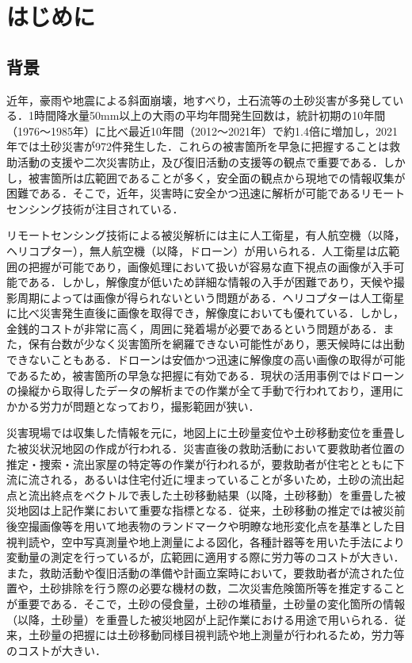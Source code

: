 \chapter{はじめに}
  \section{背景}
    近年，豪雨や地震による斜面崩壊，地すべり，土石流等の土砂災害が多発している．1時間降水量50mm以上の大雨の平均年間発生回数は，統計初期の10年間（1976〜1985年）に比べ最近10年間（2012〜2021年）で約1.4倍に増加し，2021年では土砂災害が972件発生した\cite{背景1, 背景2}．これらの被害箇所を早急に把握することは救助活動の支援や二次災害防止，及び復旧活動の支援等の観点で重要である．しかし，被害箇所は広範囲であることが多く，安全面の観点から現地での情報収集が困難である\cite{背景3}．そこで，近年，災害時に安全かつ迅速に解析が可能であるリモートセンシング技術が注目されている\cite{背景4}．

    リモートセンシング技術による被災解析には主に人工衛星，有人航空機（以降，ヘリコプター），無人航空機（以降，ドローン）が用いられる．人工衛星は広範囲の把握が可能であり，画像処理において扱いが容易な直下視点の画像が入手可能である．しかし，解像度が低いため詳細な情報の入手が困難であり，天候や撮影周期によっては画像が得られないという問題がある．ヘリコプターは人工衛星に比べ災害発生直後に画像を取得でき，解像度においても優れている．しかし，金銭的コストが非常に高く，周囲に発着場が必要であるという問題がある．また，保有台数が少なく災害箇所を網羅できない可能性があり，悪天候時には出動できないこともある．ドローンは安価かつ迅速に解像度の高い画像の取得が可能であるため，被害箇所の早急な把握に有効である．現状の活用事例ではドローンの操縦から取得したデータの解析までの作業が全て手動で行われており，運用にかかる労力が問題となっており，撮影範囲が狭い\cite{背景5, 背景6, 背景7}．

    災害現場では収集した情報を元に，地図上に土砂量変位や土砂移動変位を重畳した被災状況地図の作成が行われる．災害直後の救助活動において要救助者位置の推定・捜索・流出家屋の特定等の作業が行われるが，要救助者が住宅とともに下流に流される，あるいは住宅付近に埋まっていることが多いため，土砂の流出起点と流出終点をベクトルで表した土砂移動結果（以降，土砂移動）を重畳した被災地図は上記作業において重要な指標となる．従来，土砂移動の推定では被災前後空撮画像等を用いて地表物のランドマークや明瞭な地形変化点を基準とした目視判読や，空中写真測量や地上測量による図化，各種計器等を用いた手法により変動量の測定を行っているが，広範囲に適用する際に労力等のコストが大きい\cite{土砂移動解析背景1, 土砂移動解析背景2}．また，救助活動や復旧活動の準備や計画立案時において，要救助者が流された位置や，土砂排除を行う際の必要な機材の数，二次災害危険箇所等を推定することが重要である．そこで，土砂の侵食量，土砂の堆積量，土砂量の変化箇所の情報（以降，土砂量）を重畳した被災地図が上記作業における用途で用いられる．従来，土砂量の把握には土砂移動同様目視判読や地上測量が行われるため，労力等のコストが大きい\cite{土砂量解析背景1, 土砂量解析背景2}．



